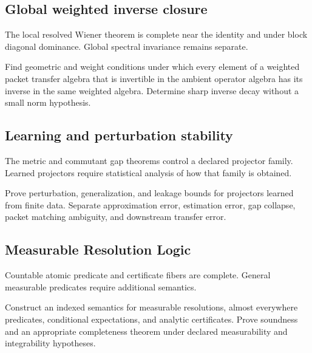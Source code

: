 \documentclass{aomart}
\theoremstyle{definition}
\theoremstyle{remark}
\begin{document}
\subsection{Global weighted inverse closure}

The local resolved Wiener theorem is complete near the identity and under block diagonal dominance. Global spectral invariance remains separate.

\begin{problem}\label{prob:wiener}
Find geometric and weight conditions under which every element of a weighted packet transfer algebra that is invertible in the ambient operator algebra has its inverse in the same weighted algebra. Determine sharp inverse decay without a small norm hypothesis.
\end{problem}

\subsection{Learning and perturbation stability}

The metric and commutant gap theorems control a declared projector family. Learned projectors require statistical analysis of how that family is obtained.

\begin{problem}\label{prob:learning}
Prove perturbation, generalization, and leakage bounds for projectors learned from finite data. Separate approximation error, estimation error, gap collapse, packet matching ambiguity, and downstream transfer error.
\end{problem}

\subsection{Measurable Resolution Logic}

Countable atomic predicate and certificate fibers are complete. General measurable predicates require additional semantics.

\begin{problem}\label{prob:infinite_logic}
Construct an indexed semantics for measurable resolutions, almost everywhere predicates, conditional expectations, and analytic certificates. Prove soundness and an appropriate completeness theorem under declared measurability and integrability hypotheses.
\end{problem}
\end{document}
